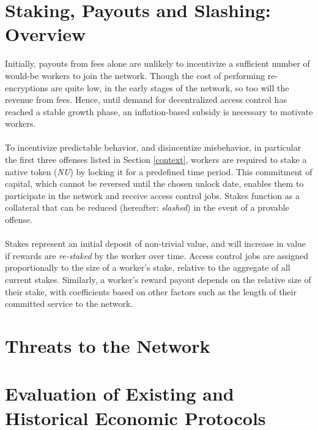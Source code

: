 \documentclass[11pt]{amsart}
\begin{document}
\section{Staking, Payouts and Slashing: Overview}

Initially, payouts from fees alone are unlikely to incentivize a sufficient number of would-be workers to join the network. Though the cost of performing re-encryptions are quite low, in the early stages of the network, so too will the revenue from fees. Hence, until demand for decentralized access control has reached a stable growth phase, an inflation-based subsidy is necessary to motivate workers.
\\
\\
To incentivize predictable behavior, and disincentize misbehavior, in particular the first three offenses listed in Section \ref{context}, workers are required to stake a native token ({\it NU}) by locking it for a predefined time period. This commitment of capital, which cannot be reversed until the chosen unlock date, enables them to participate in the network and receive access control jobs. Stakes function as a collateral that can be reduced (hereafter: {\it slashed}) in the event of a provable offense.  
\\
\\
Stakes represent an initial deposit of non-trivial value, and will increase in value if rewards are {\it re-staked} by the worker over time. Access control jobs are assigned proportionally to the size of a worker's stake, relative to the aggregate of all current stakes. Similarly, a worker's reward payout depends on the relative size of their stake, with coefficients based on other factors such as the length of their committed service to the network. 

\section{Threats to the Network}

\section{Evaluation of Existing and Historical Economic Protocols}







\appendix


\end{document}
